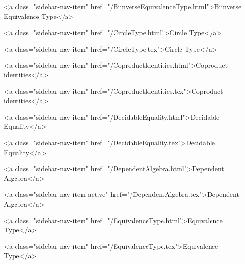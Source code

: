       
        
          <a class="sidebar-nav-item" href="/BiinverseEquivalenceType.html">Biinverse Equivalence Type</a>
        
      
    
      
        
          <a class="sidebar-nav-item" href="/CircleType.html">Circle Type</a>
        
      
    
      
        
          <a class="sidebar-nav-item" href="/CircleType.tex">Circle Type</a>
        
      
    
      
        
          <a class="sidebar-nav-item" href="/CoproductIdentities.html">Coproduct identities</a>
        
      
    
      
        
          <a class="sidebar-nav-item" href="/CoproductIdentities.tex">Coproduct identities</a>
        
      
    
      
        
          <a class="sidebar-nav-item" href="/DecidableEquality.html">Decidable Equality</a>
        
      
    
      
        
          <a class="sidebar-nav-item" href="/DecidableEquality.tex">Decidable Equality</a>
        
      
    
      
        
          <a class="sidebar-nav-item" href="/DependentAlgebra.html">Dependent Algebra</a>
        
      
    
      
        
          <a class="sidebar-nav-item active" href="/DependentAlgebra.tex">Dependent Algebra</a>
        
      
    
      
        
          <a class="sidebar-nav-item" href="/EquivalenceType.html">Equivalence Type</a>
        
      
    
      
        
          <a class="sidebar-nav-item" href="/EquivalenceType.tex">Equivalence Type</a>
        

